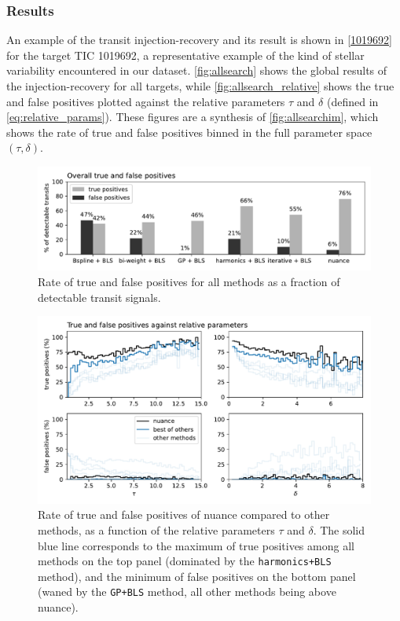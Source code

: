 \documentclass[modern,linenumbers]{aastex631}
\newcommand{\nuancecode}{\textsf{nuance}}
\newcommand{\review}[1]{#1}
\begin{document}
\subsubsection*{Results}
An example of the transit injection-recovery and its result is shown in \autoref{1019692} for the target TIC 1019692, \review{a representative example of the kind of stellar variability encountered in our dataset}. \autoref{fig:allsearch} shows the global results of the injection-recovery for all targets, while \autoref{fig:allsearch_relative} shows the true and false positives plotted against the relative parameters $\tau$ and $\delta$ (defined in \autoref{eq:relative_params}). These figures are a synthesis of \autoref{fig:allsearchim}, which shows the rate of true and false positives binned in the full parameter space $(\tau, \delta)$.
\begin{figure}[H]
    \begin{centering}
        \includegraphics[width=\linewidth]{../workflows/tess_injection_recovery/figures/tpfp_bars.pdf}
        \caption{Rate of true and false positives for all methods as a fraction of detectable transit signals.}
        \label{fig:allsearch}
    \end{centering}
\end{figure}
\begin{figure}[H]
    \begin{centering}
        \includegraphics[width=\linewidth]{../workflows/tess_injection_recovery/figures/tpfp.pdf}
        \caption{Rate of true and false positives of \nuancecode{} compared to other methods, as a function of the relative parameters $\tau$ and $\delta$. The solid blue line corresponds to the maximum of true positives among all methods on the top panel (dominated \review{by the \texttt{harmonics+BLS} method}), and the minimum of false positives on the bottom panel (waned by the \texttt{GP+BLS} method, all other methods being above \nuancecode{}).}
        \label{fig:allsearch_relative}
    \end{centering}
\end{figure}
\end{document}
